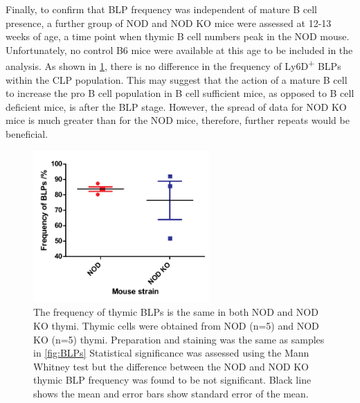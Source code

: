 Finally, to confirm that BLP frequency was independent of mature B cell presence, a further group of NOD and NOD KO mice were assessed at 12-13 weeks of age, a time point when thymic B cell numbers peak in the NOD mouse. 
Unfortunately, no control B6 mice were available at this age to be included in the analysis.
As shown in \cref{fig:olderBLPs}, there is no difference in the frequency of Ly6D\textsuperscript{+} BLPs within the CLP population.
This may suggest that the action of a mature B cell to increase the pro B cell population in B cell sufficient mice, as opposed to B cell deficient mice, is after the BLP stage.
However, the spread of data for NOD KO mice is much greater than for the NOD mice, therefore, further repeats would be beneficial.

\begin{figure}
\centering
\includegraphics[width=0.6\textwidth]{Figures/NODvKOBLPs.pdf}
\caption[The frequency of thymic BLPs is the same in both NOD and NOD KO thymi]{The frequency of thymic BLPs is the same in both NOD and NOD KO thymi.
Thymic cells were obtained from NOD (n=5) and NOD KO (n=5) thymi. Preparation and staining was the same as samples in \cref{fig:BLPs}
Statistical significance was assessed using the Mann Whitney test but the difference between the NOD and NOD KO thymic BLP frequency was found to be not significant. Black line shows the mean and error bars show standard error of the mean.}
\label{fig:olderBLPs}
\end{figure}






